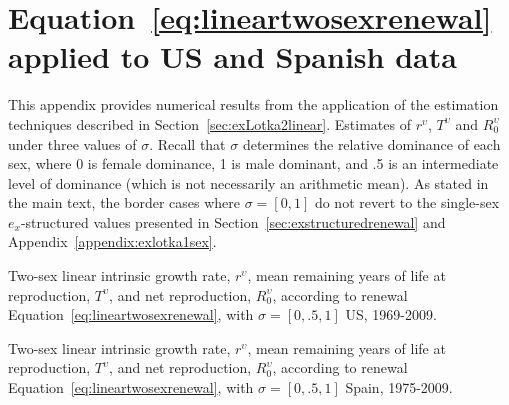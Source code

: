 \chapter{Equation~\ref{eq:lineartwosexrenewal} applied to US and Spanish data}
\label{appendix:ex2sexlinear}
This appendix provides numerical results from the application of the
estimation techniques described in Section~\ref{sec:exLotka2linear}. Estimates
of $r^\upsilon$, $T^\upsilon$ and $R_0^\upsilon$ under three values of $\sigma$.
Recall that $\sigma$ determines the relative dominance of each sex, where 0 is
female dominance, 1 is male dominant, and .5 is an intermediate level of
dominance (which is not necessarily an arithmetic mean). As stated in the
main text, the border cases where $\sigma = [0,1]$ do not revert to the
single-sex $e_x$-structured values presented in Section~\ref{sec:exstructuredrenewal} and
Appendix~\ref{appendix:exlotka1sex}.

\begin{table}
  \begin{adjustwidth}{-1in}{-.5in}
  \centering
    \caption{Two-sex linear intrinsic growth rate, $r^\upsilon$, mean remaining
years of life at reproduction, $T^\upsilon$, and net reproduction,
$R_0^\upsilon$, according to renewal Equation~\eqref{eq:lineartwosexrenewal},
with $\sigma = [0, .5, 1]$ US, 1969-2009.}
    \label{tab:ex2linRepUS}
        
  \end{adjustwidth}
\end{table}

\begin{table}
  \begin{adjustwidth}{-1in}{-.5in}
    \centering
    \caption{Two-sex linear intrinsic growth rate, $r^\upsilon$, mean remaining
years of life at reproduction, $T^\upsilon$, and net reproduction,
$R_0^\upsilon$, according to renewal Equation~\eqref{eq:lineartwosexrenewal}, with
$\sigma = [0, .5, 1]$ Spain, 1975-2009.}
    \label{tab:ex2linRepES}
        
  \end{adjustwidth}
\end{table}



